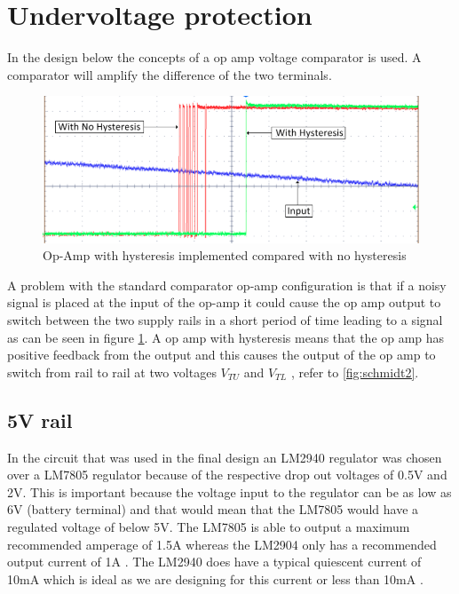 \section{Undervoltage protection}
In the design below the concepts of a op amp voltage comparator is used. A comparator will amplify the difference of the two terminals.
\begin{figure}[!htb]
\centering
\includegraphics[scale=0.2]{./Figures/hyst}
\caption[{Op-Amp with hysteresis implemented compared with no hysteresis}]{Op-Amp with hysteresis implemented compared with no hysteresis \cite{TexHyst}}
\label{fig:hyst}
\end{figure}
A problem with the standard comparator op-amp configuration is that if a noisy signal is placed at the input of the op-amp it could cause the op amp output to switch between the two supply rails in a short period of time leading to a signal as can be seen in figure \ref{fig:hyst}. A op amp with hysteresis means that the op amp has positive feedback from the output and this causes the output of the op amp to switch from rail to rail at two voltages $V_{TU}$ and $V_{TL}$ , refer to \ref{fig:schmidt2}.




\subsection{5V rail}
In the circuit that was used in the final design an LM2940 regulator was chosen over a LM7805 regulator because of the respective drop out voltages of 0.5V \cite{TexReg} and 2V\cite{TexRegpos}. This is important because the voltage input to the regulator can be as low as 6V (battery terminal) and that would mean that the LM7805 would have a regulated voltage of below 5V. The LM7805 is able to output a maximum recommended amperage of 1.5A whereas the LM2904 only has a recommended output current of 1A \cite{TexReg}\cite{TexRegpos}. The LM2940 does have a typical quiescent current of 10mA which is ideal as we are designing for this current or less than 10mA \cite{TexReg}. 

